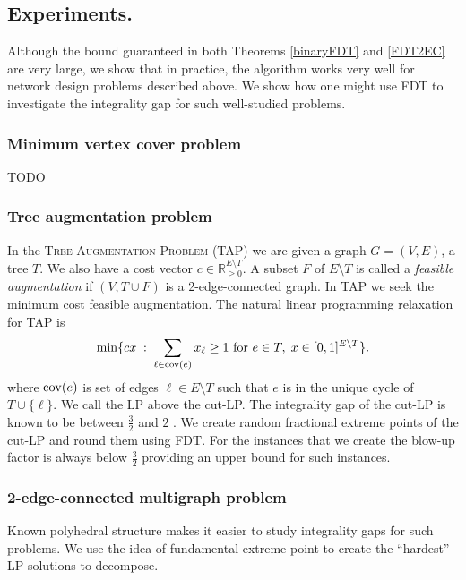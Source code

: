 \subsection{Experiments.} Although the bound guaranteed in both Theorems \ref{binaryFDT} and \ref{FDT2EC} are very large, we show that in practice, the algorithm works very well for network design problems described above. We show how one might use FDT to investigate the integrality gap for such well-studied problems.


\subsubsection{Minimum vertex cover problem}

TODO

\subsubsection{Tree augmentation problem}
In the \textsc{Tree Augmentation Problem (TAP)} we are given a  graph $G=(V,E)$, a tree $T$. We also have a cost vector $c\in \mathbb{R}^{E\setminus T}_{\geq 0}$. A subset $F$ of $E\setminus T$ is called a \textit{feasible augmentation} if $(V,T\cup F)$ is a 2-edge-connected graph. In TAP we seek the minimum cost feasible augmentation. The natural linear programming relaxation for TAP is 
\begin{equation}
\min \{cx\; : \; \sum_{\ell \in \mathrm{cov}(e)} x_{\ell} \geq 1 \text{ for } e\in T, \; x\in [0,1]^{E\setminus T}\}.
\end{equation}
where $\mathrm{cov}(e)$ is set of edges $\ell \in E\setminus T$ such that $e$ is in the unique cycle of $T\cup \{\ell\}$. We call the LP above the cut-LP. The integrality gap of the cut-LP is known to be between $\frac{3}{2}$ \cite{32gaptap} and $2$ \cite{FJ81}. We create random fractional extreme points of the cut-LP and round them using FDT. For the instances that we create the blow-up factor is always below $\frac{3}{2}$ providing an upper bound for such instances.

\subsubsection{2-edge-connected multigraph problem}
Known polyhedral structure makes it easier to study integrality gaps for such problems. We use the idea of fundamental extreme point \cite{carrravi,boydcarr,Carr2004} to create the ``hardest'' LP solutions to decompose.


